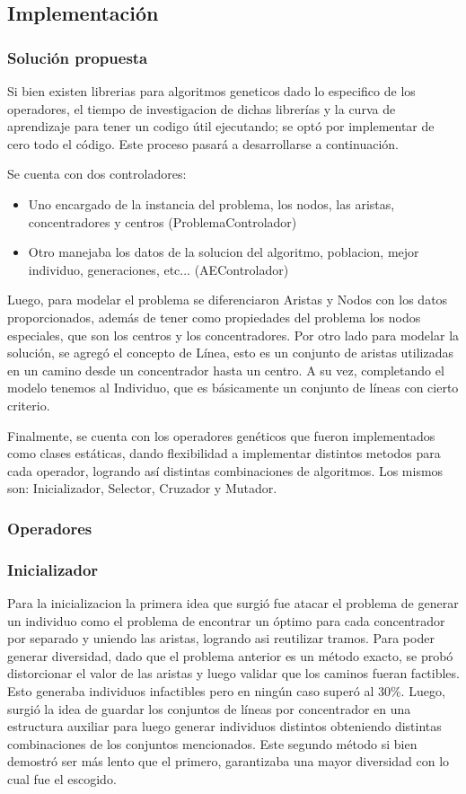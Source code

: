 \documentclass{extarticle}
\begin{document}
\subsection{Implementación}
\subsubsection{Solución propuesta}
Si bien existen librerias para algoritmos geneticos dado lo especifico de los operadores, el tiempo de investigacion de dichas librerías y la curva de aprendizaje para tener un codigo útil ejecutando; se optó por implementar de cero todo el código. Este proceso pasará a desarrollarse a continuación.

Se cuenta con dos controladores:
\begin{itemize}
	\item Uno encargado de la instancia del problema, los nodos, las aristas, concentradores y centros (ProblemaControlador)
	\item Otro manejaba los datos de la solucion del algoritmo, poblacion, mejor individuo, generaciones, etc... (AEControlador)
\end{itemize}

Luego, para modelar el problema se diferenciaron Aristas y Nodos con los datos proporcionados, además de tener como propiedades del problema los nodos especiales, que son los centros y los concentradores.
Por otro lado para modelar la solución, se agregó el concepto de Línea, esto es un conjunto de aristas utilizadas en un camino desde un concentrador hasta un centro. A su vez, completando el modelo tenemos al Individuo, que es básicamente un conjunto de líneas con cierto criterio.

Finalmente, se cuenta con los operadores genéticos que fueron implementados como clases estáticas, dando flexibilidad a implementar distintos metodos para cada operador, logrando así distintas combinaciones de algoritmos. Los mismos son: Inicializador, Selector, Cruzador y Mutador.

\subsubsection{Operadores}

\subsubsection*{Inicializador}
Para la inicializacion la primera idea que surgió fue atacar el problema de generar un individuo como el problema de encontrar un óptimo para cada concentrador por separado y uniendo las aristas, logrando asi reutilizar tramos. Para poder generar diversidad, dado que el problema anterior es un método exacto, se probó distorcionar el valor de las aristas y luego validar que los caminos fueran factibles. Esto generaba individuos infactibles pero en ningún caso superó al 30\%.
Luego, surgió la idea de guardar los conjuntos de líneas por concentrador en una estructura auxiliar para luego generar individuos distintos obteniendo distintas combinaciones de los conjuntos mencionados.
Este segundo método si bien demostró ser más lento que el primero, garantizaba una mayor diversidad con lo cual fue el escogido.
\end{document}
